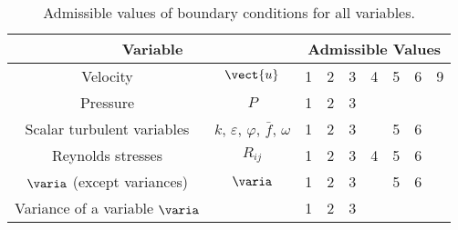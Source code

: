 \begin{table}
\begin{center}
\begin{tabular}{||c|c||p{}|p{}|p{}|p{}|p{}|p{}|p{}||}
\hline
\multicolumn{2}{||c||}{Variable}
        &\multicolumn{7}{c||}{Admissible Values}\\
\hline
Velocity                                & $\vect{u}$                                                                         &  1& 2& 3& 4& 5& 6& 9 \\
Pressure                                & $P$                                                                                   &  1& 2& 3&  &  & & \\
Scalar turbulent variables     & $k$, $\varepsilon$, $\varphi$, $\bar{f}$, $\omega$        &  1& 2& 3&  & 5& 6& \\
Reynolds stresses                & $R_{ij}$                                                                              &  1& 2& 3& 4& 5& 6& \\
$\varia$ (except variances)  &  $\varia$                                                                           &  1& 2& 3&  & 5& 6& \\
Variance of a variable $\varia$ &                                                                                      &  1& 2& 3&  &  & & \\
\hline
\end{tabular}
\end{center}
\caption{Admissible values of boundary conditions for all variables.}\label{tab:ICODCLadm_condli}
\end{table}
